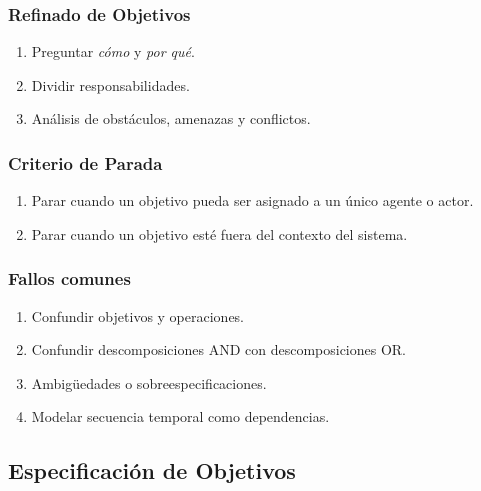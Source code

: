 \documentclass[handout,slidestop,xcolor=pst,dvips,blue]{beamer}
\begin{document}
\begin{frame}[c]
    \frametitle{Refinado de Objetivos}
    \begin{enumerate}[<+->]
         \item Preguntar \emph{cómo} y \emph{por qué}.
         \item Dividir responsabilidades.
         \item Análisis de obstáculos, amenazas y conflictos.
    \end{enumerate}
\end{frame}

\begin{frame}[c]
    \frametitle{Criterio de Parada}
    \begin{enumerate}[<+->]
         \item Parar cuando un objetivo pueda ser asignado a un único agente o actor.
         \item Parar cuando un objetivo esté fuera del contexto del sistema.
    \end{enumerate}
\end{frame}

\begin{frame}[c]
    \frametitle{Fallos comunes}
    \begin{enumerate}[<+->]
         \item Confundir objetivos y operaciones.
         \item Confundir descomposiciones AND con descomposiciones OR.
         \item Ambigüedades o sobreespecificaciones.
         \item Modelar secuencia temporal como dependencias.
    \end{enumerate}
\end{frame}

\subsection{Especificación de Objetivos}
\end{document}
